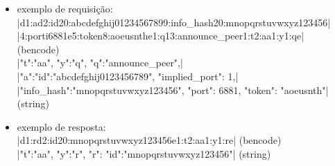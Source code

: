 
\begin{itemize}
    \item exemplo de requisição: \\
        \bverb|d1:ad2:id20:abcdefghij01234567899:info_hash20:mnopqrstuvwxyz123456| \\
        \bverb|4:porti6881e5:token8:aoeusnthe1:q13:announce_peer1:t2:aa1:y1:qe| \\
        (\gls*{bencode}) \\
        \sverb|{"t":"aa", "y":"q", "q":"announce_peer",| \\
        \sverb|"a":{"id":"abcdefghij0123456789", "implied_port": 1,| \\
        \sverb|"info_hash":"mnopqrstuvwxyz123456", "port": 6881, "token": "aoeusnth"}}|
        (\gls*{string})

    \item exemplo de resposta: \\
        \bverb|d1:rd2:id20:mnopqrstuvwxyz123456e1:t2:aa1:y1:re|
        (\gls*{bencode}) \\
        \sverb|{"t":"aa", "y":"r", "r": {"id":"mnopqrstuvwxyz123456"}}|
        (\gls*{string})
\end{itemize}